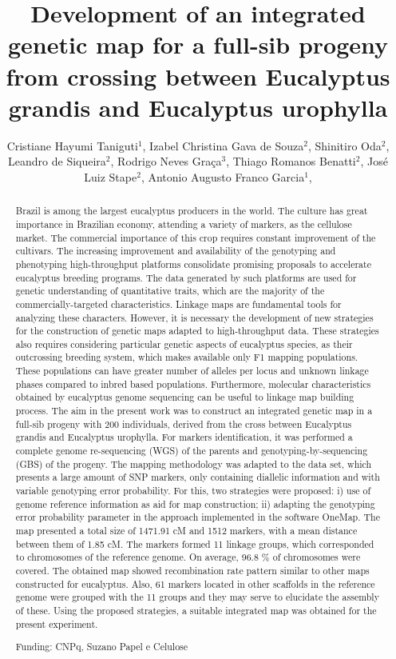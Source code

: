 \documentclass[twoside]{article}
\title{\vspace{-15mm}\fontsize{24pt}{10pt}\selectfont\textbf{ Development of an integrated genetic map for a full-sib progeny from crossing between Eucalyptus grandis and Eucalyptus urophylla }} %
\author{ Cristiane Hayumi Taniguti$^{1}$, Izabel Christina Gava de Souza$^{2}$, Shinitiro Oda$^{2}$, Leandro de Siqueira$^{2}$, Rodrigo Neves Graça$^{3}$, Thiago Romanos Benatti$^{2}$, José Luiz Stape$^{2}$, Antonio Augusto Franco Garcia$^{1}$, }
\affil{ 1 Universidade de São Paulo

2 Suzano Papel e Celulose

3 Futuragene

 }
\date{}
\begin{document}
  
  
  \maketitle %
  
  
  \thispagestyle{fancy} %
  
  
  \begin{abstract}
  Brazil is among the largest eucalyptus producers in the world. The culture has great importance in Brazilian economy, attending a variety of markers, as the cellulose market. The commercial importance of this crop requires constant improvement of the cultivars. The increasing improvement and availability of the genotyping and phenotyping high-throughput platforms consolidate promising proposals to accelerate eucalyptus breeding programs. The data generated by such platforms are used for genetic understanding of quantitative traits, which are the majority of the commercially-targeted characteristics. Linkage maps are fundamental tools for analyzing these characters. However, it is necessary the development of new strategies for the construction of genetic maps adapted to high-throughput data. These strategies also requires considering particular genetic aspects of eucalyptus species, as their outcrossing breeding system, which makes available only F1 mapping populations. These populations can have greater number of alleles per locus and unknown linkage phases compared to inbred based populations. Furthermore, molecular characteristics obtained by eucalyptus genome sequencing can be useful to linkage map building process. The aim in the present work was to construct an integrated genetic map in a full-sib progeny with 200 individuals, derived from the cross between Eucalyptus grandis and Eucalyptus urophylla. For markers identification, it was performed a complete genome re-sequencing (WGS) of the parents and genotyping-by-sequencing (GBS) of the progeny. The mapping methodology was adapted to the data set, which presents a large amount of SNP markers, only containing diallelic information and with variable genotyping error probability. For this, two strategies were proposed: i) use of genome reference information as aid for map construction; ii) adapting the genotyping error probability parameter in the approach implemented in the software OneMap. The map presented a total size of 1471.91 cM and 1512 markers, with a mean distance between them of 1.85 cM. The markers formed 11 linkage groups, which corresponded to chromosomes of the reference genome. On average, 96.8 \% of chromosomes were covered. The obtained map showed recombination rate pattern similar to other maps constructed for eucalyptus. Also, 61 markers located in other scaffolds in the reference genome were grouped with the 11 groups and they may serve to elucidate the assembly of these. Using the proposed strategies, a suitable integrated map was obtained for the present experiment.
  
  Funding: CNPq, Suzano Papel e Celulose \\ 
  \end{abstract}
  
\end{document}

